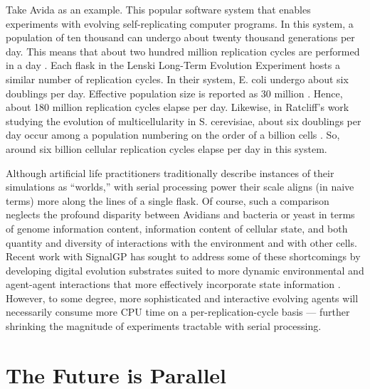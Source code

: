Take Avida as an example. This popular software system that enables experiments with evolving self-replicating computer programs.
In this system, a population of ten thousand can undergo about twenty thousand generations per day.
This means that about two hundred million replication cycles are performed in a day \citep{ofria2009artificial}.
Each flask in the Lenski Long-Term Evolution Experiment hosts a similar number of replication cycles.
In their system, E. coli undergo about six doublings per day.
Effective population size is reported as 30 million \citep{good2017dynamics}. Hence, about 180 million replication cycles elapse per day.
Likewise, in Ratcliff’s work studying the evolution of multicellularity in S. cerevisiae, about six doublings per day occur among a population numbering on the order of a billion cells \citep{ratcliff2012experimental}.
So, around six billion cellular replication cycles elapse per day in this system.

Although artificial life practitioners traditionally describe instances of their simulations as “worlds,” with serial processing power their scale aligns (in naive terms) more along the lines of a single flask.
Of course, such a comparison neglects the profound disparity between Avidians and bacteria or yeast in terms of genome information content, information content of cellular state, and both quantity and diversity of interactions with the environment and with other cells.
Recent work with SignalGP has sought to address some of these shortcomings by developing digital evolution substrates suited to more dynamic environmental and agent-agent interactions \citep{lalejini2018evolving} that more effectively incorporate state information \citep{lalejini2021tag,lalejini2020case, moreno2019evaluating}.
However, to some degree, more sophisticated and interactive evolving agents will necessarily consume more CPU time on a per-replication-cycle basis --- further shrinking the magnitude of experiments tractable with serial processing.

\section{The Future is Parallel}

